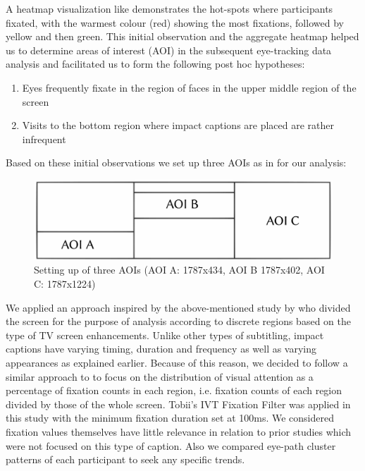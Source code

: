 \documentclass[output=paper]{langsci/langscibook}
\begin{document}
A heatmap visualization like  demonstrates the hot-spots where participants fixated, with the warmest colour (red) showing the most fixations, followed by yellow and then green. This initial observation and the aggregate heatmap helped us to determine areas of interest (AOI) in the subsequent eye-tracking data analysis and facilitated us to form the following post hoc hypotheses:

\begin{enumerate}
\item Eyes frequently fixate in the region of faces in the upper middle region of the screen
\item Visits to the bottom region where impact captions are placed are rather infrequent
\end{enumerate}

Based on these initial observations we set up three AOIs as in  for our analysis:

\begin{figure}
 \includegraphics[width=\textwidth]{figures/OHagan3.pdf}


	\caption{Setting up of three AOIs (AOI A: 1787x434, AOI B 1787x402, AOI C: 1787x1224)}
	\label{ohagan:fig:3}
\end{figure}

We applied an approach inspired by the above-mentioned study by \citet{josephson2006} who divided the screen for the purpose of analysis according to discrete regions based on the type of TV screen enhancements. Unlike other types of subtitling, impact captions have varying timing, duration and frequency as well as varying appearances as explained earlier.  Because of this reason, we decided to follow a similar approach to \citet{josephson2006} to focus on the distribution of visual attention as a percentage of fixation counts in each region, i.e. fixation counts of each region divided by those of the whole screen.  Tobii's IVT Fixation Filter was applied in this study with the minimum fixation duration set at 100ms. We considered fixation values themselves have little relevance in relation to prior studies which were not focused on this type of caption. Also we compared eye-path cluster patterns of each participant to seek any specific trends.  
\end{document}
